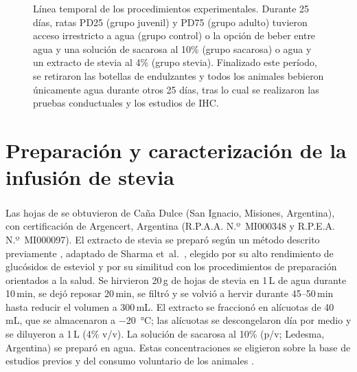 \begin{figure}[htbp]
\caption[Línea temporal de los procedimientos experimentales]{Línea temporal de los procedimientos experimentales. Durante 25 días, ratas PD25 (grupo juvenil) y PD75 (grupo adulto) tuvieron acceso irrestricto a agua (grupo control) o la opción de beber entre agua y una solución de sacarosa al 10\% (grupo sacarosa) o agua y un extracto de stevia al 4\% (grupo stevia). Finalizado este período, se retiraron las botellas de endulzantes y todos los animales bebieron únicamente agua durante otros 25 días, tras lo cual se realizaron las pruebas conductuales y los estudios de IHC.}
\label{fig:linea-temporal}
\end{figure}

\FloatBarrier
\section{Preparación y caracterización de la infusión de stevia}\label{sec:soluciones}

Las hojas de \stevia{} se obtuvieron de Caña Dulce\textsuperscript{\textregistered} (San Ignacio, Misiones, Argentina), con certificación de Argencert, Argentina (R.P.A.A. N.º~MI000348 y R.P.E.A. N.º~MI000097). El extracto de stevia se preparó según un método descrito previamente \cite{kruse2025stevia}, adaptado de Sharma et~al.\ \cite{sharma2009stevia}, elegido por su alto rendimiento de glucósidos de esteviol \cite{celaya2022infusions} y por su similitud con los procedimientos de preparación orientados a la salud. Se hirvieron 20\,g de hojas de stevia en 1\,L de agua durante 10\,min, se dejó reposar 20\,min, se filtró y se volvió a hervir durante 45--50\,min hasta reducir el volumen a 300\,mL. El extracto se fraccionó en alícuotas de 40\,mL, que se almacenaron a \SI{-20}{\celsius}; las alícuotas se descongelaron día por medio y se diluyeron a 1\,L (4\% v/v). La solución de sacarosa al 10\% (p/v; Ledesma, Argentina) se preparó en agua. Estas concentraciones se eligieron sobre la base de estudios previos y del consumo voluntario de los animales \cite{coirini2022sucrose,rey2024metformin,kruse2019sucrose,kruse2025stevia}.

